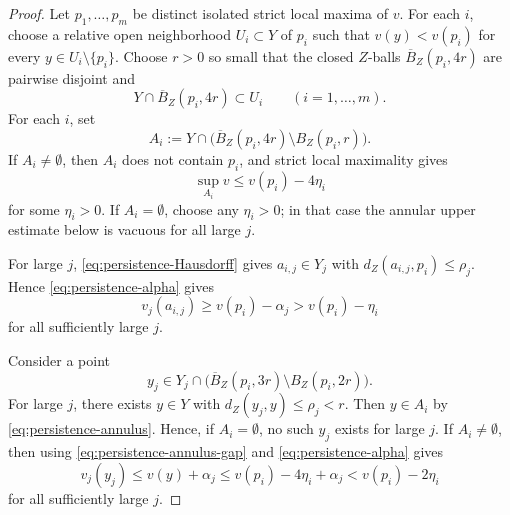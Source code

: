 \documentclass[11pt]{amsart}
\numberwithin{equation}{section}
\begin{document}
\begin{proof}
Let $p_1,\ldots,p_m$ be distinct isolated strict local maxima of $v$.  For each
$i$, choose a relative open neighborhood $U_i\subset Y$ of $p_i$ such that
$v(y)<v(p_i)$ for every $y\in U_i\setminus\{p_i\}$.  Choose $r>0$ so small
that the closed $Z$-balls $\overline B_Z(p_i,4r)$ are pairwise disjoint and
$$
Y\cap\overline B_Z(p_i,4r)\subset U_i
\qquad(i=1,\ldots,m).
$$
For each $i$, set
\begin{equation}\label{eq:persistence-annulus}
A_i:=Y\cap\bigl(\overline B_Z(p_i,4r)\setminus B_Z(p_i,r)\bigr).
\end{equation}
If $A_i\ne\emptyset$, then $A_i$ does not contain $p_i$, and strict local
maximality gives
\begin{equation}\label{eq:persistence-annulus-gap}
\sup_{A_i}v\le v(p_i)-4\eta_i
\end{equation}
for some $\eta_i>0$.  If $A_i=\emptyset$, choose any $\eta_i>0$; in that case the
annular upper estimate below is vacuous for all large $j$.

For large $j$, \eqref{eq:persistence-Hausdorff} gives $a_{i,j}\in Y_j$ with
$d_Z(a_{i,j},p_i)\le\rho_j$.  Hence \eqref{eq:persistence-alpha} gives
\begin{equation}\label{eq:persistence-lower-test-point}
v_j(a_{i,j})\ge v(p_i)-\alpha_j>v(p_i)-\eta_i
\end{equation}
for all sufficiently large $j$.

Consider a point
$$
y_j\in Y_j\cap\bigl(\overline B_Z(p_i,3r)\setminus B_Z(p_i,2r)\bigr).
$$
For large $j$, there exists $y\in Y$ with $d_Z(y_j,y)\le\rho_j<r$.  Then
$y\in A_i$ by \eqref{eq:persistence-annulus}.  Hence, if $A_i=\emptyset$, no such
$y_j$ exists for large $j$.  If $A_i\ne\emptyset$, then using
\eqref{eq:persistence-annulus-gap} and \eqref{eq:persistence-alpha} gives
\begin{equation}\label{eq:persistence-upper-annulus}
v_j(y_j)\le v(y)+\alpha_j\le v(p_i)-4\eta_i+\alpha_j
< v(p_i)-2\eta_i
\end{equation}
for all sufficiently large $j$.


\end{proof}
\end{document}
